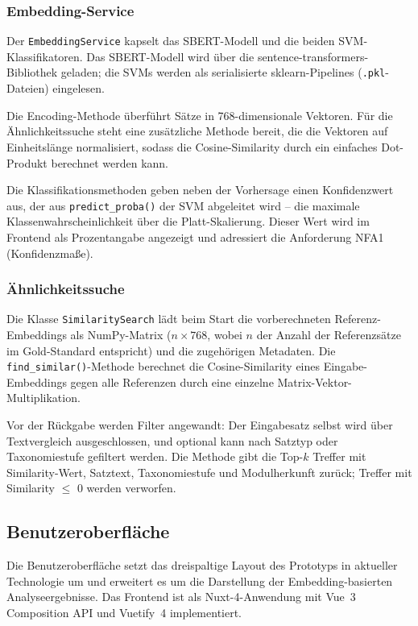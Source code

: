 \subsubsection{Embedding-Service}\label{sec:impl-embedding-service}

Der \texttt{EmbeddingService} kapselt das SBERT-Modell und die beiden SVM-Klassifikatoren.
Das SBERT-Modell wird über die sentence-transformers-Bibliothek geladen; die SVMs werden als serialisierte sklearn-Pipelines (\texttt{.pkl}-Dateien) eingelesen.

Die Encoding-Methode überführt Sätze in 768-dimensionale Vektoren.
Für die Ähnlichkeitssuche steht eine zusätzliche Methode bereit, die die Vektoren auf Einheitslänge normalisiert, sodass die Cosine-Similarity durch ein einfaches Dot-Produkt berechnet werden kann.

Die Klassifikationsmethoden geben neben der Vorhersage einen Konfidenzwert aus, der aus \texttt{predict\_proba()} der SVM abgeleitet wird -- die maximale Klassenwahrscheinlichkeit über die Platt-Skalierung.
Dieser Wert wird im Frontend als Prozentangabe angezeigt und adressiert die Anforderung NFA1 (Konfidenzmaße).

\subsubsection{Ähnlichkeitssuche}\label{sec:impl-similarity}

Die Klasse \texttt{SimilaritySearch} lädt beim Start die vorberechneten Referenz-Embeddings als NumPy-Matrix ($n \times 768$, wobei $n$ der Anzahl der Referenzsätze im Gold-Standard entspricht) und die zugehörigen Metadaten.
Die \texttt{find\_similar()}-Methode berechnet die Cosine-Similarity eines Eingabe-Embeddings gegen alle Referenzen durch eine einzelne Matrix-Vektor-Multiplikation.

Vor der Rückgabe werden Filter angewandt: Der Eingabesatz selbst wird über Textvergleich ausgeschlossen, und optional kann nach Satztyp oder Taxonomiestufe gefiltert werden.
Die Methode gibt die Top-$k$ Treffer mit Similarity-Wert, Satztext, Taxonomiestufe und Modulherkunft zurück; Treffer mit Similarity $\leq$ 0 werden verworfen.

\subsection{Benutzeroberfläche}\label{sec:impl-ui}

Die Benutzeroberfläche setzt das dreispaltige Layout des Prototyps in aktueller Technologie um und erweitert es um die Darstellung der Embedding-basierten Analyseergebnisse.
Das Frontend ist als Nuxt-4-Anwendung mit Vue~3 Composition API und Vuetify~4 implementiert.

